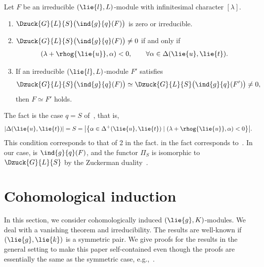 \begin{Fact}\label{fact:BorelWeilBott}
	Let $F$ be an irreducible $(\lie{l}, L)$-module with infinitesimal character $[\lambda]$.
	\begin{enumerate}\itemsep=0pt
		\item[$1.$] $\Dzuck{G}{L}{S}\bigl(\ind{g}{q}(F)\bigr)$ is zero or irreducible.
		\item[$2.$] $\Dzuck{G}{L}{S}\bigl(\ind{g}{q}(F)\bigr) \neq 0$ if and only if
		\begin{align*}
			(\lambda + \rhog{\lie{u}}, \alpha) < 0, \qquad \forall \alpha \in \Delta(\lie{u}, \lie{t}).
		\end{align*}
		\item[$3.$] If an irreducible $(\lie{l}, L)$-module $F'$ satisfies
		\begin{align*}
			\Dzuck{G}{L}{S}\bigl(\ind{g}{q}(F)\bigr)\simeq \Dzuck{G}{L}{S}\bigl(\ind{g}{q}(F')\bigr) \neq 0,
		\end{align*}
		then $F\simeq F'$ holds.
	\end{enumerate}
\end{Fact}

\begin{Remark}
	The fact is the case $q = S$ of~\cite[Corollary~4.160]{KnVo95_cohomological_induction}, that is,
	\begin{align*}
		|\Delta(\lie{u}, \lie{t})| = S = \bigl|\bigl\{\alpha \in \Delta^+(\lie{u}, \lie{t}) \mid (\lambda + \rhog{\lie{u}}, \alpha) < 0\bigr\}\bigr|.
	\end{align*}
	This condition corresponds to that of 2 in the fact.
	 in the fact corresponds to~.
	In our case,  is $\ind{g}{q}(F)$,
	and the functor $\Pi_{S}$ is isomorphic to $\Dzuck{G}{L}{S}$ by the Zuckerman duality~\cite[Corollary~3.7]{KnVo95_cohomological_induction}.
\end{Remark}


\section{Cohomological induction}

In this section, we consider cohomologically induced $(\lie{g}, K)$-modules.
We deal with a vanishing theorem and irreducibility.
The results are well-known if $(\lie{g}, \lie{k})$ is a symmetric pair.
We give proofs for the results in the general setting to make this paper self-contained
even though the proofs are essentially the same as the symmetric case, e.g.,~\cite[Section~6]{Wa88_real_reductive_I}.

